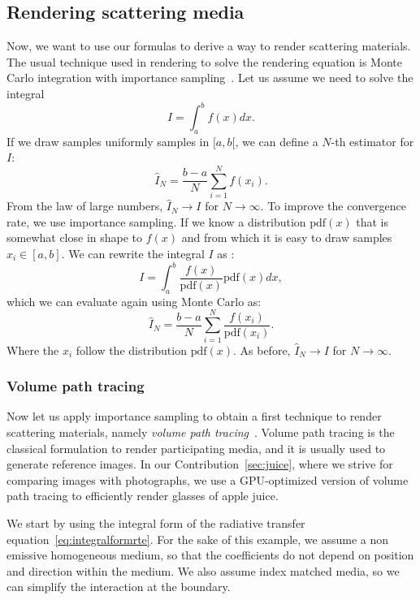 \subsection{Rendering scattering media}
\label{sec:renderingscattering}
Now, we want to use our formulas to derive a way to render scattering materials. The usual technique used in rendering to solve the rendering equation is Monte Carlo integration with importance sampling~\cite{Kalos2008}. Let us assume we need to solve the integral
\begin{equation*}
I = \int_a^b f(x) dx.
\end{equation*}
If we draw samples uniformly samples in $[a,b[$, we can define a $N$-th estimator for $I$:
\begin{equation*}
\hat{I}_N = \frac{b-a}{N} \sum_{i=1}^N f(x_i).
\end{equation*}
From the law of large numbers, $\hat{I}_N \rightarrow I$ for $N \rightarrow \infty$. To improve the convergence rate, we use importance sampling. If we know a distribution $\text{pdf}(x)$ that is somewhat close in shape to $f(x)$ and from which it is easy to draw samples $x_i \in [a,b]$. We can rewrite the integral $I$ as :
\begin{equation*}
I = \int_a^b \frac{f(x)}{\text{pdf}(x)} \text{pdf}(x) dx,
\end{equation*}
which we can evaluate again using Monte Carlo as:
\begin{equation*}
\hat{I}_N = \frac{b-a}{N} \sum_{i=1}^N \frac{f(x_i)}{\text{pdf}(x_i)}.
\end{equation*}
Where the $x_i$ follow the distribution $\text{pdf}(x)$. As before, $\hat{I}_N \rightarrow I$ for $N \rightarrow \infty$.

\subsubsection{Volume path tracing}
\label{sec:volumept}
Now let us apply importance sampling to obtain a first technique to render scattering materials, namely \emph{volume path tracing}~\cite{Rushmeier1988}. Volume path tracing is the classical formulation to render participating media, and it is usually used to generate reference images. In our Contribution~\ref{sec:juice}, where we strive for comparing images with photographs, we use a GPU-optimized version of volume path tracing to efficiently render glasses of apple juice.

We start by using the integral form of the radiative transfer equation~\ref{eq:integralformrte}. For the sake of this example, we assume a non emissive homogeneous medium, so that the coefficients do not depend on position and direction within the medium. We also assume index matched media, so we can simplify the interaction at the boundary. 

